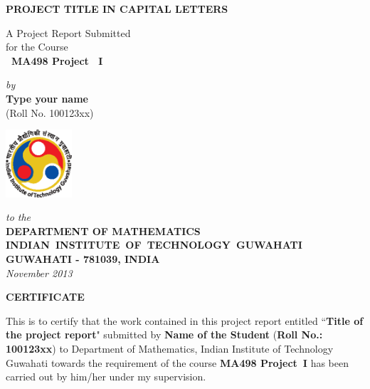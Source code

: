 \documentclass[12pt,a4paper]{report}
\theoremstyle{plain}
\theoremstyle{definition}
\theoremstyle{remark}
\begin{document}


\begin{titlepage}
\enlargethispage{3cm}

\begin{center}

\vspace*{-2cm}

\textbf{\Large PROJECT TITLE IN CAPITAL LETTERS}

\vfill

 A Project Report Submitted \\
for the Course \\[1cm]

{\bf\Large\ MA498 Project ~I }\\[.1in]

 \vfill

{\large \emph{by}}\\[5pt]
{\large\bf {Type your name}}\\[5pt]
{\large (Roll No. 100123xx)}

\vfill
\includegraphics[height=2.5cm]{iitglogo}

\vspace*{0.5cm}

{\em\large to the}\\[10pt]
{\bf\large DEPARTMENT OF MATHEMATICS} \\[5pt]
{\bf\large \mbox{INDIAN INSTITUTE OF TECHNOLOGY GUWAHATI}}\\[5pt]
{\bf\large GUWAHATI - 781039, INDIA}\\[10pt]
{\it\large November 2013}
\end{center}

\end{titlepage}

\clearpage

 \setcounter{page}{2}
\begin{center}
{\Large{\bf{CERTIFICATE}}}
\end{center}


\noindent
This is to certify that the work contained in this project report
entitled ``{\bf Title of the project report}" submitted
by {\bf Name of the Student} ({\bf Roll No.: 100123xx}) to Department of Mathematics, Indian Institute of Technology Guwahati
towards the requirement of the course \textbf{MA498 Project~I}
has been carried out by him/her under my
supervision.
\end{document}
